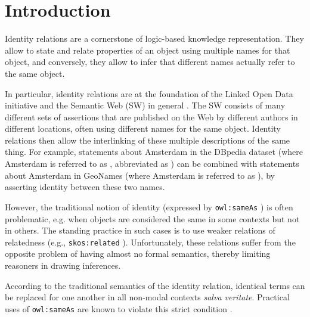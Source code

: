 \section{Introduction}
\label{sec:introduction}

Identity relations are a cornerstone of logic-based knowledge representation.
They allow to state and relate properties of an object
  using multiple names for that object, and conversely,
  they allow to infer that different names actually refer to the same object.

In particular, identity relations are
  at the foundation of the Linked Open Data initiative
  and the Semantic Web (SW) in general \cite{BizerCyganiakHeath2007}.
The SW consists of many different sets of assertions
  that are published on the Web by different authors in different locations,
  often using different names for the same object.
Identity relations then allow the interlinking of these multiple descriptions
  of the same thing.
For example, statements about Amsterdam in the DBpedia dataset
  (where Amsterdam is referred to as
  , abbreviated as
  )
  can be combined with statements about Amsterdam in GeoNames
  (where Amsterdam is referred to as
  ), by asserting identity between
  these two names.

However, the traditional notion of identity
  (expressed by \texttt{owl:sameAs} \cite{MotikPaterschneiderGrau2012})
  is often problematic, e.g. when objects are considered the same in some
  contexts but not in others.
The standing practice in such cases is to use weaker relations of relatedness
  (e.g., \texttt{skos:related} \cite{MilesBechhofer2009}).
Unfortunately, these relations suffer from the opposite problem of having
  almost no formal semantics, thereby limiting reasoners
  in drawing inferences.

According to the traditional semantics of the identity relation,
  identical terms can be replaced for one another in all non-modal contexts
  \emph{salva veritate}.
Practical uses of \texttt{owl:sameAs} are known to violate this
  strict condition
  \cite{HalpinHayes2010,HalpinHayesMccuskerMcguinnessThompson2010}.

\begin{comment}
The SW is not only a formal model,
  but is also a social component that evolves over time,
  i.e. it is a social machine cite{Www2013}.
Being a social and symbolic system at the same time,
  meaning on the SW is denoted by its semantics as well as its pragmatics.
\end{comment}

